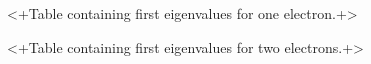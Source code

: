 <+Table containing first eigenvalues for one electron.+>

<+Table containing first eigenvalues for two electrons.+>
